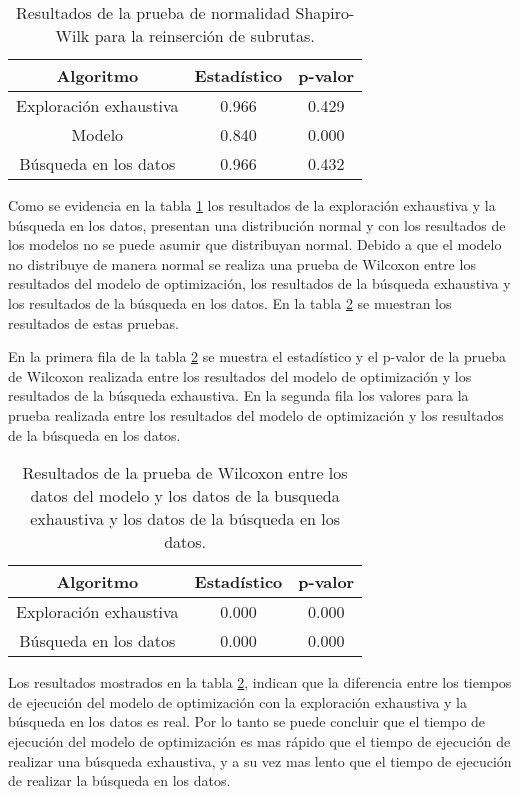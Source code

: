 \documentclass[12pt]{report}
\begin{document}
\begin{table}[h]
	\centering
	\begin{tabular}{|c|c|c|}
		\hline
		\textbf{Algoritmo} & \textbf{Estadístico} & \textbf{p-valor} \\
		\hline
		Exploración exhaustiva & 0.966 & 0.429 \\
		\hline
 		Modelo & 0.840 & 0.000 \\
		\hline
		Búsqueda en los datos & 0.966 & 0.432 \\
		\hline
	\end{tabular}
	\caption{Resultados de la prueba de normalidad Shapiro-Wilk para la reinserción de subrutas.}
	\label{tab:Shapiro 2model}
\end{table}

Como se evidencia en la tabla \ref{tab:Shapiro 2model} los resultados de la exploración exhaustiva y la búsqueda en los datos, presentan una distribución normal y con los resultados de los modelos no se puede asumir que distribuyan normal. Debido a que el modelo no distribuye de manera normal se realiza una prueba de Wilcoxon entre los resultados del modelo de optimización, los resultados de la búsqueda exhaustiva y los resultados de la búsqueda en los datos. En la tabla \ref{tab:Wilcoxon 2model} se muestran los resultados de estas pruebas.

En la primera fila de la tabla \ref{tab:Wilcoxon 2model} se muestra el estadístico y el p-valor de la prueba de Wilcoxon realizada entre los resultados del modelo de optimización y los resultados de la búsqueda exhaustiva. En la segunda fila los valores para la prueba realizada entre los resultados del modelo de optimización y los resultados de la búsqueda en los datos.

\begin{table}[h]
	\centering
	\begin{tabular}{|c|c|c|}
		\hline
		\textbf{Algoritmo} & \textbf{Estadístico} & \textbf{p-valor} \\
		\hline
		Exploración exhaustiva  & 0.000 & 0.000 \\
		\hline
		Búsqueda en los datos  & 0.000 & 0.000 \\
		\hline
	\end{tabular}
	\caption{Resultados de la prueba de Wilcoxon entre los datos del modelo y los datos de la busqueda exhaustiva y los datos de la búsqueda en los datos.}
	\label{tab:Wilcoxon 2model}
\end{table}

Los resultados mostrados en la tabla \ref{tab:Wilcoxon 2model}, indican que la diferencia entre los tiempos de ejecución del modelo de optimización con la exploración exhaustiva y la búsqueda en los datos es real. Por lo tanto se puede concluir que el tiempo de ejecución del modelo de optimización es mas rápido que el tiempo de ejecución de realizar una búsqueda exhaustiva, y a su vez mas lento que el tiempo de ejecución de realizar la búsqueda en los datos.
\end{document}
